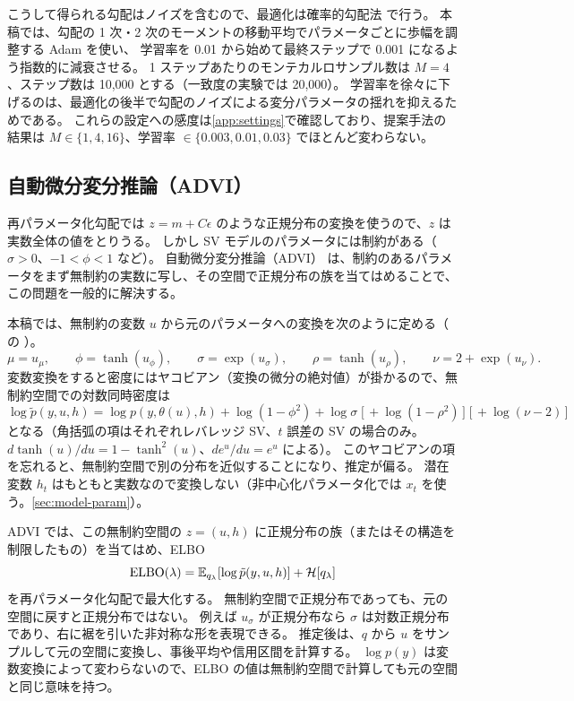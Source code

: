 こうして得られる勾配はノイズを含むので、最適化は確率的勾配法 \parencite{robbins1951} で行う。
本稿では、勾配の 1 次・2 次のモーメントの移動平均でパラメータごとに歩幅を調整する Adam \parencite{kingma2015} を使い、
学習率を 0.01 から始めて最終ステップで 0.001 になるよう指数的に減衰させる。
1 ステップあたりのモンテカルロサンプル数は $M = 4$、ステップ数は 10,000 とする（一致度の実験では 20,000）。
学習率を徐々に下げるのは、最適化の後半で勾配のノイズによる変分パラメータの揺れを抑えるためである。
これらの設定への感度は\cref{app:settings}で確認しており、提案手法の結果は $M \in \{1, 4, 16\}$、学習率 $\in \{0.003, 0.01, 0.03\}$ でほとんど変わらない。

\subsection{自動微分変分推論（ADVI）}\label{sec:inf-advi}

再パラメータ化勾配では $z = m + C\epsilon$ のような正規分布の変換を使うので、$z$ は実数全体の値をとりうる。
しかし SV モデルのパラメータには制約がある（$\sigma > 0$、$-1 < \phi < 1$ など）。
自動微分変分推論（ADVI）\parencite{kucukelbir2017} は、制約のあるパラメータをまず無制約の実数に写し、その空間で正規分布の族を当てはめることで、この問題を一般的に解決する。

本稿では、無制約の変数 $u$ から元のパラメータへの変換を次のように定める（ の ）。
\[
  \mu = u_\mu, \qquad
  \phi = \tanh(u_\phi), \qquad
  \sigma = \exp(u_\sigma), \qquad
  \rho = \tanh(u_\rho), \qquad
  \nu = 2 + \exp(u_\nu).
\]
変数変換をすると密度にはヤコビアン（変換の微分の絶対値）が掛かるので、無制約空間での対数同時密度は
\begin{equation}
  \log \tilde p(y, u, h) = \log p\!\left(y, \theta(u), h\right) + \log(1 - \phi^2) + \log \sigma \;\Big[\, + \log(1 - \rho^2) \,\Big] \;\Big[\, + \log(\nu - 2) \,\Big]
  \label{eq:advi-jacobian}
\end{equation}
となる（角括弧の項はそれぞれレバレッジ SV、$t$ 誤差の SV の場合のみ。$d\tanh(u)/du = 1 - \tanh^2(u)$、$d e^u/du = e^u$ による）。
このヤコビアンの項を忘れると、無制約空間で別の分布を近似することになり、推定が偏る。
潜在変数 $h_t$ はもともと実数なので変換しない（非中心化パラメータ化では $x_t$ を使う。\cref{sec:model-param}）。

ADVI では、この無制約空間の $z = (u, h)$ に正規分布の族（またはその構造を制限したもの）を当てはめ、ELBO
\[
  \mathrm{ELBO}(\lambda) = \mathbb{E}_{q_\lambda}\!\left[\log \tilde p(y, u, h)\right] + \mathcal{H}[q_\lambda]
\]
を再パラメータ化勾配で最大化する。
無制約空間で正規分布であっても、元の空間に戻すと正規分布ではない。
例えば $u_\sigma$ が正規分布なら $\sigma$ は対数正規分布であり、右に裾を引いた非対称な形を表現できる。
推定後は、$q$ から $u$ をサンプルして元の空間に変換し、事後平均や信用区間を計算する。
$\log p(y)$ は変数変換によって変わらないので、ELBO の値は無制約空間で計算しても元の空間と同じ意味を持つ。

